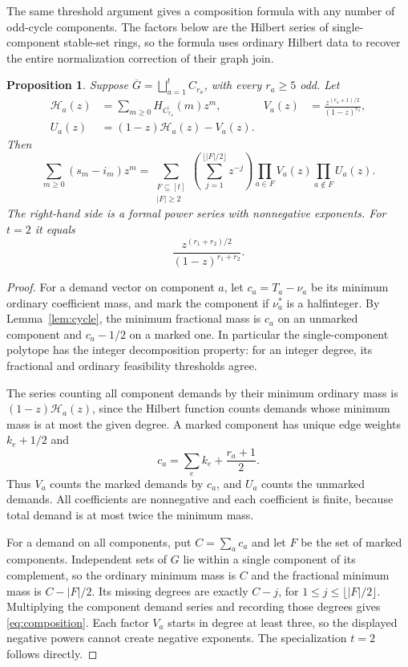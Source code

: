 \documentclass[11pt]{article}
\newtheorem{proposition}[theorem]{Proposition}
\theoremstyle{remark}
\begin{document}
The same threshold argument gives a composition formula with any number
of odd-cycle components. The factors below are the Hilbert series of
single-component stable-set rings, so the formula uses ordinary Hilbert
data to recover the entire normalization correction of their graph join.

\begin{proposition}\label{prop:composition}
Suppose $\overline G=\bigsqcup_{a=1}^t C_{r_a}$, with every $r_a\geq5$
odd. Let
\begin{align*}
\mathcal H_a(z)&=\sum_{m\geq0}H_{\overline{C_{r_a}}}(m)z^m,
&V_a(z)&=\frac{z^{(r_a+1)/2}}{(1-z)^{r_a}},\\
U_a(z)&=(1-z)\mathcal H_a(z)-V_a(z).
\end{align*}
Then
\begin{equation}\label{eq:composition}
\sum_{m\geq0}(s_m-i_m)z^m
=\sum_{\substack{F\subseteq[t]\\ |F|\geq2}}
\left(\sum_{j=1}^{\lfloor|F|/2\rfloor}z^{-j}\right)
\prod_{a\in F}V_a(z)\prod_{a\notin F}U_a(z).
\end{equation}
The right-hand side is a formal power series with nonnegative exponents.
For $t=2$ it equals
\[
\frac{z^{(r_1+r_2)/2}}{(1-z)^{r_1+r_2}}.
\]
\end{proposition}
\begin{proof}
For a demand vector on component $a$, let
$c_a=T_a-\nu_a$ be its minimum ordinary coefficient mass, and mark the
component if $\nu_a^*$ is a halfinteger. By Lemma~\ref{lem:cycle}, the
minimum fractional mass is $c_a$ on an unmarked component and
$c_a-1/2$ on a marked one. In particular the single-component polytope
has the integer decomposition property: for an integer degree, its
fractional and ordinary feasibility thresholds agree.

The series counting all component demands by their minimum ordinary
mass is $(1-z)\mathcal H_a(z)$, since the Hilbert function counts
demands whose minimum mass is at most the given degree. A marked
component has unique edge weights $k_e+1/2$ and
\[
c_a=\sum_e k_e+\frac{r_a+1}{2}.
\]
Thus $V_a$ counts the marked demands by $c_a$, and $U_a$ counts the
unmarked demands. All coefficients are nonnegative and each
coefficient is finite, because total demand is at most twice the
minimum mass.

For a demand on all components, put $C=\sum_a c_a$ and let $F$ be the
set of marked components. Independent sets of $G$ lie within a single
component of its complement, so the ordinary minimum mass is $C$ and
the fractional minimum mass is $C-|F|/2$. Its missing degrees are
exactly $C-j$, for $1\leq j\leq\lfloor|F|/2\rfloor$. Multiplying the
component demand series and recording those degrees gives
\eqref{eq:composition}. Each factor $V_a$ starts in degree at least
three, so the displayed negative powers cannot create negative
exponents. The specialization $t=2$ follows directly.
\end{proof}
\end{document}
